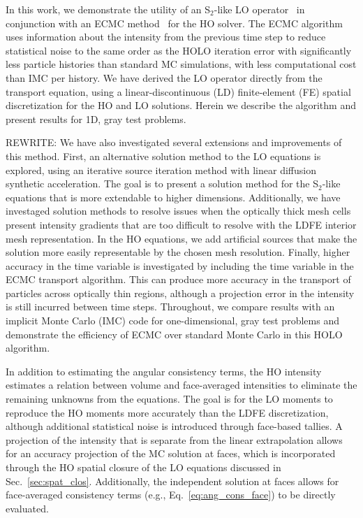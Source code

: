 In this work, we demonstrate the utility of an S$_2$-like LO operator~\cite{wolters}
in conjunction with an ECMC method~\cite{jake} for the HO solver.
The ECMC algorithm uses information about the intensity from the previous time step to reduce statistical noise to the same order as
the HOLO iteration error with significantly less particle histories than standard MC
simulations, with less computational cost than IMC per history.  We have derived the LO operator directly from the transport
equation, using a linear-discontinuous (LD) finite-element (FE) spatial
discretization for the HO and LO solutions. Herein we describe the algorithm and
present results for 1D, gray test problems.



REWRITE:
We have also investigated several extensions and improvements of this method.  First, an alternative
solution method to the LO equations is explored, using an iterative source iteration
method with linear diffusion synthetic acceleration.  The goal is to present a solution
method for the S$_2$-like equations that is more extendable to higher dimensions.
Additionally, we have investaged solution methods to resolve issues when the optically
thick mesh cells present intensity gradients that are too difficult to resolve with the
LDFE interior mesh representation.   In the HO equations, we add artificial sources that
make the solution more easily representable by the chosen mesh resolution.  Finally, higher accuracy in the time
variable is investigated by including the time variable in the ECMC transport
algorithm.  This can produce more accuracy in the transport of particles across optically
thin regions, although a projection error in the intensity is still incurred between time
steps. Throughout, we compare results with an
implicit Monte Carlo (IMC) code for one-dimensional, gray test problems and 
demonstrate the efficiency of ECMC over standard Monte Carlo in this HOLO algorithm.


In addition to estimating the angular
consistency terms, the HO intensity estimates a relation between volume and face-averaged
intensities to eliminate the remaining unknowns from the equations.  The goal is for the 
LO moments to reproduce the HO moments more accurately than the LDFE discretization, although
additional statistical noise is introduced through face-based tallies.
A projection of the intensity
that is separate from the linear extrapolation allows for an accuracy projection of the MC
solution at faces, which is incorporated through the HO spatial closure of 
the LO equations discussed in Sec.~\ref{sec:spat_clos}.  Additionally, the independent solution at faces allows for face-averaged
consistency terms (e.g., Eq.~\eqref{eq:ang_cons_face}) to be directly evaluated. 

